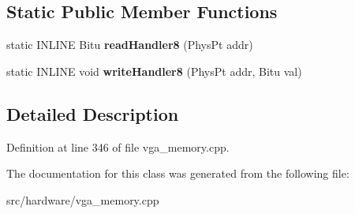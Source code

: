 \subsection*{Static Public Member Functions}
\begin{DoxyCompactItemize}
\item 
\hypertarget{classVGA__ET4000__ChainedVGA__Slow__Handler_aaaf88b1fe358e7af3b0411aa2a176fee}{static I\-N\-L\-I\-N\-E Bitu {\bfseries read\-Handler8} (Phys\-Pt addr)}\label{classVGA__ET4000__ChainedVGA__Slow__Handler_aaaf88b1fe358e7af3b0411aa2a176fee}

\item 
\hypertarget{classVGA__ET4000__ChainedVGA__Slow__Handler_ae2f914cb52258b4126058bfa4344198f}{static I\-N\-L\-I\-N\-E void {\bfseries write\-Handler8} (Phys\-Pt addr, Bitu val)}\label{classVGA__ET4000__ChainedVGA__Slow__Handler_ae2f914cb52258b4126058bfa4344198f}

\end{DoxyCompactItemize}


\subsection{Detailed Description}


Definition at line 346 of file vga\-\_\-memory.\-cpp.



The documentation for this class was generated from the following file\-:\begin{DoxyCompactItemize}
\item 
src/hardware/vga\-\_\-memory.\-cpp\end{DoxyCompactItemize}
